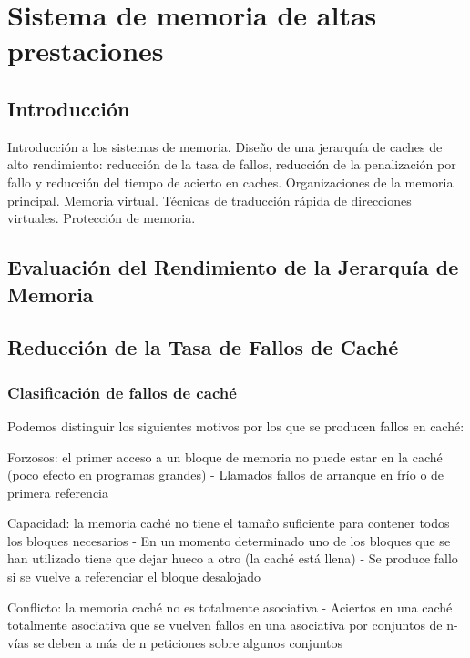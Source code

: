 \documentclass[12pt,onecolumn]{memoir}
\begin{document}
\chapter{Sistema de memoria de altas prestaciones}
\label{cap:memoria}


\section{Introducción}
\label{sec:introduccion_memoria}

Introducción a los sistemas de memoria. Diseño de una jerarquía de caches de alto rendimiento: reducción de la tasa de fallos,  reducción de la penalización por fallo y reducción del tiempo de acierto en caches. Organizaciones de la memoria principal. Memoria virtual. Técnicas de traducción rápida de direcciones virtuales. Protección de memoria.

\section{Evaluación del Rendimiento de la Jerarquía de Memoria}

\section{Reducción de la Tasa de Fallos de Caché}

\subsection{Clasificación de fallos de caché}

Podemos distinguir los siguientes motivos por los que se 
producen fallos en caché:

Forzosos: el primer acceso a un bloque de memoria no puede 
estar en la caché (poco efecto en programas grandes)
- Llamados fallos de arranque en frío o de primera referencia

Capacidad: la memoria caché no tiene el tamaño suficiente para 
contener todos los bloques necesarios
- En un momento determinado uno de los bloques que se han 
utilizado tiene que dejar hueco a otro (la caché está llena)
- Se produce fallo si se vuelve a referenciar el bloque desalojado

Conflicto: la memoria caché no es totalmente asociativa 
- Aciertos en una caché totalmente asociativa que se vuelven 
fallos en una asociativa por conjuntos de 
n-vías se deben a más de n peticiones sobre algunos conjuntos
\end{document}

